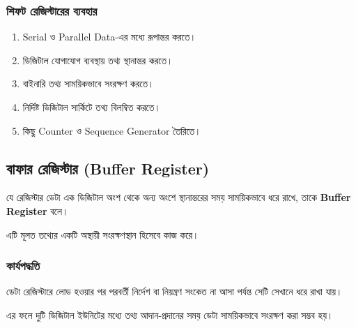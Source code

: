 
\subsubsection*{শিফট রেজিস্টারের ব্যবহার}

\begin{enumerate}[leftmargin=*,itemsep=2pt]

    \item \textenglish{Serial} ও \textenglish{Parallel Data}-এর মধ্যে
    রূপান্তর করতে।

    \item ডিজিটাল যোগাযোগ ব্যবস্থায় তথ্য স্থানান্তর করতে।

    \item বাইনারি তথ্য সাময়িকভাবে সংরক্ষণ করতে।

    \item নির্দিষ্ট ডিজিটাল সার্কিটে তথ্য বিলম্বিত করতে।

    \item কিছু \textenglish{Counter} ও
    \textenglish{Sequence Generator} তৈরিতে।

\end{enumerate}



\subsection{বাফার রেজিস্টার
(\textenglish{Buffer Register})}

যে রেজিস্টার ডেটা এক ডিজিটাল অংশ থেকে অন্য অংশে স্থানান্তরের সময়
সাময়িকভাবে ধরে রাখে, তাকে
\textbf{\textenglish{Buffer Register}} বলে।

এটি মূলত তথ্যের একটি অস্থায়ী সংরক্ষণস্থান হিসেবে কাজ করে।

\subsubsection*{কার্যপদ্ধতি}

ডেটা রেজিস্টারে লোড হওয়ার পর পরবর্তী নির্দেশ বা নিয়ন্ত্রণ সংকেত
না আসা পর্যন্ত সেটি সেখানে ধরে রাখা যায়।

এর ফলে দুটি ডিজিটাল ইউনিটের মধ্যে তথ্য আদান-প্রদানের সময়
ডেটা সাময়িকভাবে সংরক্ষণ করা সম্ভব হয়।

